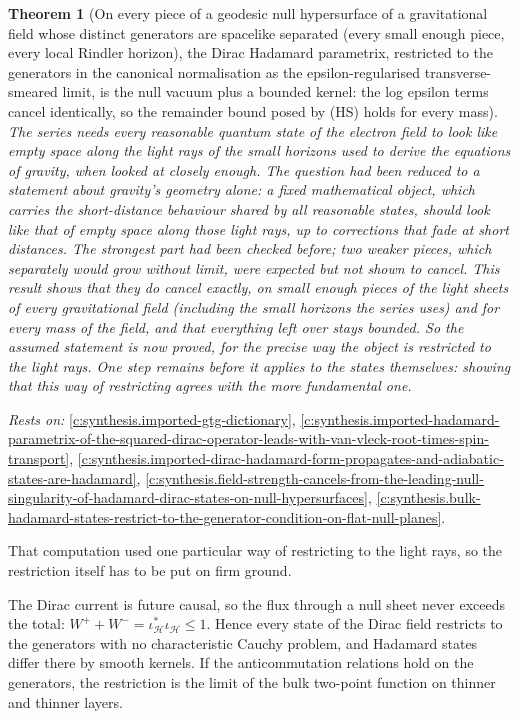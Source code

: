 \documentclass[11pt]{article}
\newtheorem{theorem}{Theorem}[section]
\theoremstyle{definition}
\theoremstyle{plain}
\begin{document}
\begin{theorem}[On every piece of a geodesic null hypersurface of a gravitational field whose distinct generators are spacelike separated (every small enough piece, every local Rindler horizon), the Dirac Hadamard parametrix, restricted to the generators in the canonical normalisation as the epsilon-regularised transverse-smeared limit, is the null vacuum plus a bounded kernel: the log epsilon terms cancel identically, so the remainder bound posed by (HS) holds for every mass]\label{c:synthesis.restricted-dirac-hadamard-parametrix-on-a-null-hypersurface-is-the-null-vacuum-plus-a-bounded-kernel}
The series needs every reasonable quantum state of the electron field to look like empty space along the light rays of the small horizons used to derive the equations of gravity, when looked at closely enough. The question had been reduced to a statement about gravity's geometry alone: a fixed mathematical object, which carries the short-distance behaviour shared by all reasonable states, should look like that of empty space along those light rays, up to corrections that fade at short distances. The strongest part had been checked before; two weaker pieces, which separately would grow without limit, were expected but not shown to cancel. This result shows that they do cancel exactly, on small enough pieces of the light sheets of every gravitational field (including the small horizons the series uses) and for every mass of the field, and that everything left over stays bounded. So the assumed statement is now proved, for the precise way the object is restricted to the light rays. One step remains before it applies to the states themselves: showing that this way of restricting agrees with the more fundamental one.
\end{theorem}
\noindent\emph{Rests on:} \ref{c:synthesis.imported-gtg-dictionary}, \ref{c:synthesis.imported-hadamard-parametrix-of-the-squared-dirac-operator-leads-with-van-vleck-root-times-spin-transport}, \ref{c:synthesis.imported-dirac-hadamard-form-propagates-and-adiabatic-states-are-hadamard}, \ref{c:synthesis.field-strength-cancels-from-the-leading-null-singularity-of-hadamard-dirac-states-on-null-hypersurfaces}, \ref{c:synthesis.bulk-hadamard-states-restrict-to-the-generator-condition-on-flat-null-planes}.

That computation used one particular way of restricting to the light rays, so the restriction itself has to be put on firm ground.

The Dirac current is future causal, so the flux through a null sheet never exceeds the total: $W^{+} + W^{-} = \iota_{\mathcal{H}}^{*}\iota_{\mathcal{H}} \le 1$. Hence every state of the Dirac field restricts to the generators with no characteristic Cauchy problem, and Hadamard states differ there by smooth kernels. If the anticommutation relations hold on the generators, the restriction is the limit of the bulk two-point function on thinner and thinner layers.
\end{document}
